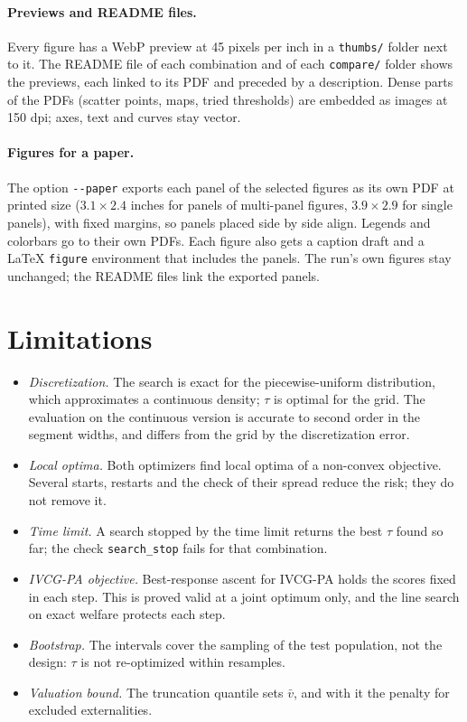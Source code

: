 \documentclass[11pt]{article}
\newcommand{\code}[1]{\texttt{#1}}
\begin{document}
\paragraph{Previews and README files.} Every figure has a WebP preview at 45 pixels per inch in a \code{thumbs/} folder next to it. The README file of each combination and of each \code{compare/} folder shows the previews, each linked to its PDF and preceded by a description. Dense parts of the PDFs (scatter points, maps, tried thresholds) are embedded as images at 150 dpi; axes, text and curves stay vector.

\paragraph{Figures for a paper.} The option \code{-{}-paper} exports each panel of the selected figures as its own PDF at printed size ($3.1\times2.4$ inches for panels of multi-panel figures, $3.9\times2.9$ for single panels), with fixed margins, so panels placed side by side align. Legends and colorbars go to their own PDFs. Each figure also gets a caption draft and a \LaTeX{} \code{figure} environment that includes the panels. The run's own figures stay unchanged; the README files link the exported panels.

\section{Limitations}\label{sec:limitations}

\begin{itemize}
    \item \emph{Discretization.} The search is exact for the piecewise-uniform distribution, which approximates a continuous density; $\tau$ is optimal for the grid. The evaluation on the continuous version is accurate to second order in the segment widths, and differs from the grid by the discretization error.
    \item \emph{Local optima.} Both optimizers find local optima of a non-convex objective. Several starts, restarts and the check of their spread reduce the risk; they do not remove it.
    \item \emph{Time limit.} A search stopped by the time limit returns the best $\tau$ found so far; the check \code{search\_stop} fails for that combination.
    \item \emph{IVCG-PA objective.} Best-response ascent for IVCG-PA holds the scores fixed in each step. This is proved valid at a joint optimum only, and the line search on exact welfare protects each step.
    \item \emph{Bootstrap.} The intervals cover the sampling of the test population, not the design: $\tau$ is not re-optimized within resamples.
    \item \emph{Valuation bound.} The truncation quantile sets $\bar v$, and with it the penalty for excluded externalities.
\end{itemize}



\end{document}
